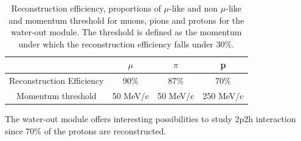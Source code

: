\begin{table}[htbp]
  \begin{center}
    \caption{\label{tab:reconstructedparticles_empty} Reconstruction efficiency, proportions of $\mu$-like and non $\mu$-like and momentum threshold for muons, pions and protons for the water-out module.
The threshold is defined as the momentum under which the reconstruction efficiency falls under $30\%$.}
    \begin{tabular}{c|ccc}
      \hline
      & $\mu$ & $\pi$ & p \\
      \hline
      Reconstruction Efficiency & 90\% & 87\% & 70\% \\ \hline
      Momentum threshold & 50 MeV/c & 50 MeV/c & 250 MeV/c  \\ \hline
    \end{tabular}
  \end{center}
\end{table}
%
The water-out module offers interesting possibilities to study 2p2h interaction since $70\%$ of the protons are reconstructed.

